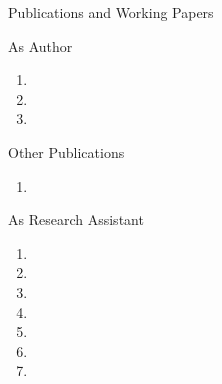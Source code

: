 \documentclass[10pt]{resume} %
\begin{document}
	
	\begin{rSection}{Publications and Working Papers}\itemsep -5pt
		
	\begin{rSubsection}{As Author}{}{}{}
  \begin{enumerate}
    \item {}
    \item {}
    \item {}
  \end{enumerate}
  \end{rSubsection}
  
  	\begin{rSubsection}{Other Publications}{}{}{}
  \begin{enumerate}
    \item {}
  \end{enumerate}
  \end{rSubsection}
  
  \begin{rSubsection}{As Research Assistant}{}{}{}
  \begin{enumerate}
    \item {}
    \item {}
    \item {}
    \item {}
    \item {}
    \item {}
    \item {}
  \end{enumerate}
	\end{rSubsection}

	\end{rSection}
	
\end{document}
